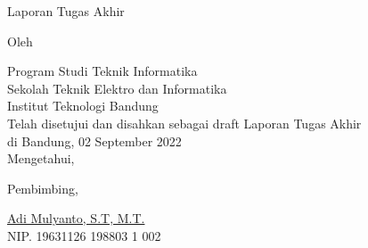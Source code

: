 \clearpage
\pagestyle{empty}

\begin{center}
    \smallskip

    \Large \bfseries \MakeUppercase{\thetitle}
    \vfill

    \Large Laporan Tugas Akhir
    \vfill

    \large Oleh

    \Large \theauthor

    \large Program Studi Teknik Informatika \\

    \normalsize \normalfont
    Sekolah Teknik Elektro dan Informatika \\
    Institut Teknologi Bandung \\

    \vfill
    \normalsize \normalfont
    Telah disetujui dan disahkan sebagai draft Laporan Tugas Akhir \\
    di Bandung, 02 September 2022 \\
    Mengetahui,

    \vspace{0.5cm}
    Pembimbing,

    \vfill
    \underline{Adi Mulyanto, S.T, M.T.} \\
    NIP. 19631126 198803 1 002

\end{center}
\clearpage
